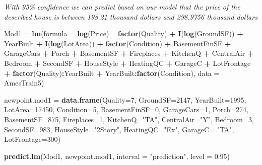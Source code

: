 \documentclass[
]{article}
\newenvironment{Shaded}{\begin{snugshade}}{\end{snugshade}}
\newcommand{\DataTypeTok}[1]{\textcolor[rgb]{0.13,0.29,0.53}{#1}}
\newcommand{\DecValTok}[1]{\textcolor[rgb]{0.00,0.00,0.81}{#1}}
\newcommand{\FloatTok}[1]{\textcolor[rgb]{0.00,0.00,0.81}{#1}}
\newcommand{\KeywordTok}[1]{\textcolor[rgb]{0.13,0.29,0.53}{\textbf{#1}}}
\newcommand{\NormalTok}[1]{#1}
\newcommand{\OperatorTok}[1]{\textcolor[rgb]{0.81,0.36,0.00}{\textbf{#1}}}
\newcommand{\StringTok}[1]{\textcolor[rgb]{0.31,0.60,0.02}{#1}}
\begin{document}
\emph{With 95\% confidence we can predict based on our model that the
price of the described house is between 198.21 thousand dollars and
298.9756 thousand dollars}

\begin{Shaded}
\begin{Highlighting}[]
\NormalTok{Mod1 =}\StringTok{ }\KeywordTok{lm}\NormalTok{(}\DataTypeTok{formula =} \KeywordTok{log}\NormalTok{(Price) }\OperatorTok{~}\StringTok{ }\KeywordTok{factor}\NormalTok{(Quality) }\OperatorTok{+}\StringTok{ }\KeywordTok{I}\NormalTok{(}\KeywordTok{log}\NormalTok{(GroundSF)) }\OperatorTok{+}\StringTok{ }
\StringTok{    }\NormalTok{YearBuilt }\OperatorTok{+}\StringTok{ }\KeywordTok{I}\NormalTok{(}\KeywordTok{log}\NormalTok{(LotArea)) }\OperatorTok{+}\StringTok{ }\KeywordTok{factor}\NormalTok{(Condition) }\OperatorTok{+}\StringTok{ }\NormalTok{BasementFinSF }\OperatorTok{+}\StringTok{ }
\StringTok{    }\NormalTok{GarageCars }\OperatorTok{+}\StringTok{ }\NormalTok{Porch }\OperatorTok{+}\StringTok{ }\NormalTok{BasementSF }\OperatorTok{+}\StringTok{ }\NormalTok{Fireplaces }\OperatorTok{+}\StringTok{ }\NormalTok{KitchenQ }\OperatorTok{+}\StringTok{ }
\StringTok{    }\NormalTok{CentralAir }\OperatorTok{+}\StringTok{ }\NormalTok{Bedroom }\OperatorTok{+}\StringTok{ }\NormalTok{SecondSF }\OperatorTok{+}\StringTok{ }\NormalTok{HouseStyle }\OperatorTok{+}\StringTok{ }\NormalTok{HeatingQC }\OperatorTok{+}\StringTok{ }
\StringTok{    }\NormalTok{GarageC }\OperatorTok{+}\StringTok{ }\NormalTok{LotFrontage }\OperatorTok{+}\StringTok{ }\KeywordTok{factor}\NormalTok{(Quality)}\OperatorTok{:}\NormalTok{YearBuilt }\OperatorTok{+}\StringTok{ }\NormalTok{YearBuilt}\OperatorTok{:}\KeywordTok{factor}\NormalTok{(Condition), }
    \DataTypeTok{data =}\NormalTok{ AmesTrain5)}

\NormalTok{newpoint.mod1 =}\StringTok{ }\KeywordTok{data.frame}\NormalTok{(}\DataTypeTok{Quality=}\DecValTok{7}\NormalTok{, }\DataTypeTok{GroundSF=}\DecValTok{2147}\NormalTok{, }\DataTypeTok{YearBuilt=}\DecValTok{1995}\NormalTok{, }\DataTypeTok{LotArea=}\DecValTok{17450}\NormalTok{, }\DataTypeTok{Condition=}\DecValTok{5}\NormalTok{, }\DataTypeTok{BasementFinSF=}\DecValTok{0}\NormalTok{, }\DataTypeTok{GarageCars=}\DecValTok{1}\NormalTok{, }\DataTypeTok{Porch=}\DecValTok{274}\NormalTok{, }\DataTypeTok{BasementSF=}\DecValTok{875}\NormalTok{, }\DataTypeTok{Fireplaces=}\DecValTok{1}\NormalTok{, }\DataTypeTok{KitchenQ=}\StringTok{"TA"}\NormalTok{, }\DataTypeTok{CentralAir=}\StringTok{"Y"}\NormalTok{, }\DataTypeTok{Bedroom=}\DecValTok{3}\NormalTok{, }\DataTypeTok{SecondSF=}\DecValTok{983}\NormalTok{, }\DataTypeTok{HouseStyle=}\StringTok{"2Story"}\NormalTok{, }\DataTypeTok{HeatingQC=}\StringTok{"Ex"}\NormalTok{, }\DataTypeTok{GarageC=} \StringTok{"TA"}\NormalTok{, }\DataTypeTok{LotFrontage=}\DecValTok{300}\NormalTok{)}

\KeywordTok{predict.lm}\NormalTok{(Mod1, newpoint.mod1, }\DataTypeTok{interval =} \StringTok{"prediction"}\NormalTok{, }\DataTypeTok{level =} \FloatTok{0.95}\NormalTok{)}
\end{Highlighting}
\end{Shaded}
\end{document}
